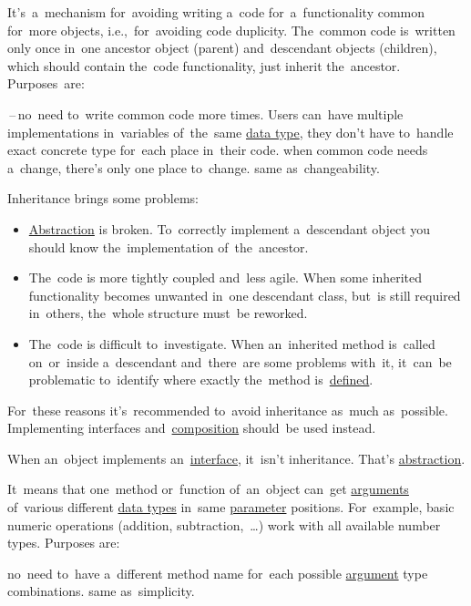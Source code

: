 \label{inheritance}
It's~a~mechanism for~avoiding writing a~code for~a~functionality common for~more objects, i.e.,~for~avoiding code duplicity.
The~common code is~written only once in~one ancestor object (parent) and~descendant objects (children), which should contain the~code functionality, just inherit the~ancestor.
Purposes~are:
\begin{itemize}
    \,--\,no~need to~write common code more times.
            Users can~have multiple implementations in~variables of~the~same \hyperref[datatypes]{data type}, they don't have to~handle exact concrete type for~each place in~their code.
     when common code needs a~change, there's only one place to~change.
     same as~changeability.
\end{itemize}

\warning Inheritance brings some problems:
\begin{itemize}
    \item \hyperref[abstraction]{Abstraction} is broken.
          To~correctly implement a~descendant object you should know the~implementation of~the~ancestor.
    \item The~code is more tightly coupled and~less agile.
          When some inherited functionality becomes unwanted in~one descendant class, but~is still required in~others, the~whole structure must~be reworked.
    \item The~code is difficult to~investigate.
          When an~inherited method is~called on~or~inside a~descendant and~there~are some problems with~it, it~can~be problematic to~identify where exactly the~method is~\hyperref[declarationdefinition]{defined}.
\end{itemize}
For~these reasons it's~recommended to~avoid inheritance as~much as~possible.
Implementing interfaces and~\hyperref[compositionoverinheritance]{composition} should~be used instead.

\warning When an~object implements an~\hyperref[javainterface]{interface}, it~isn't inheritance.
That's \hyperref[abstraction]{abstraction}.

\label{polymorphism}
It~means that one~method or~function of~an~object can~get \hyperref[parameterargument]{arguments} of~various different \hyperref[datatypes]{data types} in~same \hyperref[parameterargument]{parameter} positions.
For~example, basic numeric operations (addition, subtraction,~\dots) work with all available number types.
Purposes are:
\begin{itemize}
     no~need to~have a~different method name for~each possible \hyperref[parameterargument]{argument} type combinations.
     same as~simplicity.
\end{itemize}
\newpage

